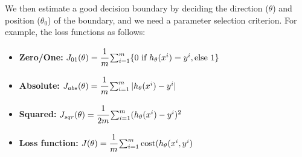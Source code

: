 We then estimate a good decision boundary by deciding the direction ($\theta$) and position ($\theta_0$) of the boundary, and we need a parameter selection criterion. For example, the loss functions as follows:
\begin{itemize}
    \item \textbf{Zero/One:} $J_{01}(\theta) = \cfrac{1}{m} \sum_{i=1}^m \{ 0 \text{ if } h_\theta(x^i) = y^i, \text{else } 1 \}$
    \item \textbf{Absolute:} $J_{abs}(\theta) = \cfrac{1}{m} \sum_{i=1}^m | h_\theta(x^i) - y^i |$
    \item \textbf{Squared:} $J_{sqr}(\theta) = \cfrac{1}{2m} \sum_{i=1}^m (h_\theta(x^i) - y^i )^2$
    \item \textbf{Loss function:} $J(\theta) = \cfrac{1}{m} \sum_{i=1}^m \text{cost}(h_\theta(x^i, y^i)$
\end{itemize}











\newpage